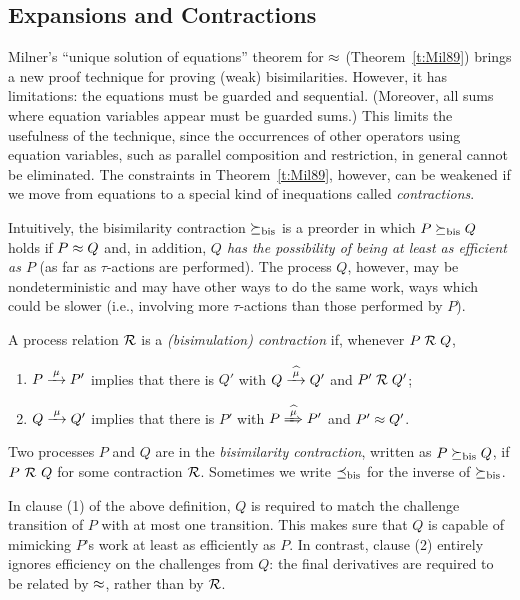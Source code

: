 \subsection{Expansions and Contractions}
\label{s:mcontr}

Milner's ``unique solution of equations'' theorem for $\approx$
(Theorem~\ref{t:Mil89})
brings a new proof technique for proving (weak) bisimilarities. However, it has
 limitations: the equations must be guarded and sequential. (Moreover,
all sums where equation variables appear must be guarded sums.)
This limits the usefulness of the technique, since
the occurrences of other operators using equation variables, such as parallel
composition and restriction,
in general cannot be eliminated. %
The constraints in Theorem~\ref{t:Mil89}, however, can be
weakened if we move from equations to a special kind of inequations called
  \emph{contractions}.

Intuitively, the bisimilarity contraction $\mathrel{\succeq_{\rm{bis}}}$ is a preorder
in which $P \mathrel{\succeq_{\rm{bis}}} Q$ holds if $P \approx Q$ and, in addition, 
\emph{$Q$ has the possibility of being at least as efficient as $P$} (as far as
$\tau$-actions are performed).
The process $Q$, however, may be nondeterministic and may have other ways
to do the same work, ways which could be slower (i.e., involving
more $\tau$-actions than those performed by $P$).

\begin{definition}[contraction]
\label{d:BisCon}
A process relation ${{\cal R}}$ 
 is a \emph{(bisimulation) contraction} if, whenever $P\mathrel{\cal R} Q$,

\begin{enumerate}
\item $P \arr\mu P'$ implies that there is $Q'$ with $Q \arcap \mu
  Q'$ and $P' \mathrel{\cal R} Q'$;
\item $Q \arr\mu Q'$ implies that there is $P'$ with $P \Arcap \mu
 P'$ and $P' \approx Q'$.
\end{enumerate}
Two processes $P$ and $Q$ are in the \emph{bisimilarity
contraction}, written as $P \mathrel{\succeq_{\rm{bis}}} Q$,
if $P\ {\cal R}\ Q$ for some contraction ${\cal R}$.
Sometimes we write $\mathrel{\preceq_{\rm{bis}}}$ for the inverse of $\mathrel{\succeq_{\rm{bis}}}$.
\end{definition}
In clause (1) of the above definition, $Q$ is required to match the challenge
transition of $P$ with at most one transition.
This makes sure that $Q$ is capable of mimicking %
$P$'s work at least as efficiently as $P$. 
In contrast, clause (2) entirely ignores efficiency on the challenges from $Q$:
the final derivatives are required to be related by $\approx$, rather than by ${\cal R}$.

